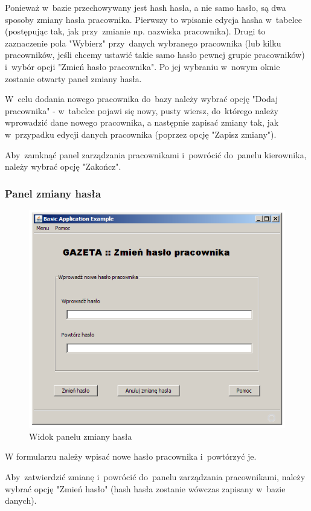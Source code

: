 Ponieważ w~bazie przechowywany jest hash hasła, a nie samo hasło, są dwa sposoby zmiany hasła pracownika. Pierwszy to wpisanie edycja hasha w~tabelce (postępując tak, jak przy~zmianie np. nazwiska pracownika). Drugi to zaznaczenie pola "Wybierz" przy~danych wybranego pracownika (lub kilku pracowników, jeśli chcemy ustawić takie samo hasło pewnej grupie pracowników) i~wybór opcji "Zmień hasło pracownika". Po jej wybraniu w~nowym oknie zostanie otwarty panel zmiany hasła.

W~celu dodania nowego pracownika do~bazy należy wybrać opcję "Dodaj pracownika" - w~tabelce pojawi się nowy, pusty wiersz, do~którego należy wprowadzić dane nowego pracownika, a następnie zapisać zmiany tak, jak w~przypadku edycji danych pracownika (poprzez opcję "Zapisz zmiany").

Aby~zamknąć panel zarządzania pracownikami i~powrócić do~panelu kierownika, należy wybrać opcję "Zakończ".
\clearpage
\subsubsection{Panel zmiany hasła}
\begin{figure}[h]
\includegraphics[width=1\textwidth]{gfx/zmiana_hasla.png}
\caption{Widok panelu zmiany hasła}
\end{figure}
W formularzu należy wpisać nowe hasło pracownika i~powtórzyć je.

Aby~zatwierdzić zmianę i~powrócić do~panelu zarządzania pracownikami, należy wybrać opcję "Zmień hasło" (hash hasła zostanie wówczas zapisany w~bazie danych).

